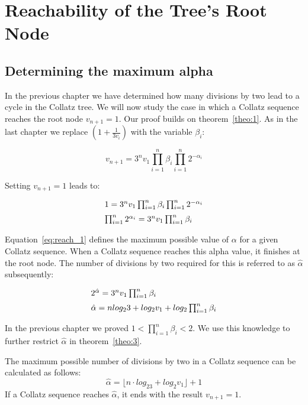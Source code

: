 \chapter{Reachability of the Tree's Root Node}

\section{Determining the maximum alpha}
In the previous chapter we have determined how many divisions by two lead to a cycle in the Collatz tree. We will now study the case in which a Collatz sequence reaches the root node $v_{n+1}=1$. Our proof builds on theorem~\ref{theo:1}. As in the last chapter we replace $(1+\frac{1}{3v_i})$ with the variable $\beta_i$:

\[
v_{n+1}=3^nv_1\prod_{i=1}^{n}\beta_i\prod_{i=1}^{n}2^{-\alpha_i}
\]

Setting $v_{n+1}=1$ leads to:

\begin{equation}
\label{eq:reach_1}
\begin{array}{l}
1=3^nv_1\prod_{i=1}^{n}\beta_i\prod_{i=1}^{n}2^{-\alpha_i}
\\[\medskipamount]
\prod_{i=1}^{n}2^{\alpha_i}=3^nv_1\prod_{i=1}^{n}\beta_i
\end{array}	
\end{equation}

\par\medskip
Equation~\ref{eq:reach_1} defines the maximum possible value of $\alpha$ for a given Collatz sequence. When a Collatz sequence reaches this alpha value, it finishes at the root node. The number of divisions by two required for this is referred to as $\hat\alpha$ subsequently:

\begin{equation*}
\begin{array}{l}
2^{\hat\alpha}=3^nv_1\prod_{i=1}^{n}\beta_i
\\[\medskipamount]
\hat\alpha=nlog_23+log_2v_1+log_2\prod_{i=1}^{n}\beta_i
\end{array}	
\end{equation*}

\par\medskip
In the previous chapter we proved $1<\prod_{i=1}^{n}\beta_i<2$. We use this knowledge to further restrict $\hat\alpha$ in theorem~\ref{theo:3}.

\bigskip
\begin{theorem}
\label{theo:3}
The maximum possible number of divisions by two in a Collatz sequence can be calculated as follows:
\[
\hat\alpha=\lfloor n\cdot log_23+log_2v_1\rfloor+1
\]
If a Collatz sequence reaches $\hat\alpha$, it ends with the result $v_{n+1}=1$.
\end{theorem}

